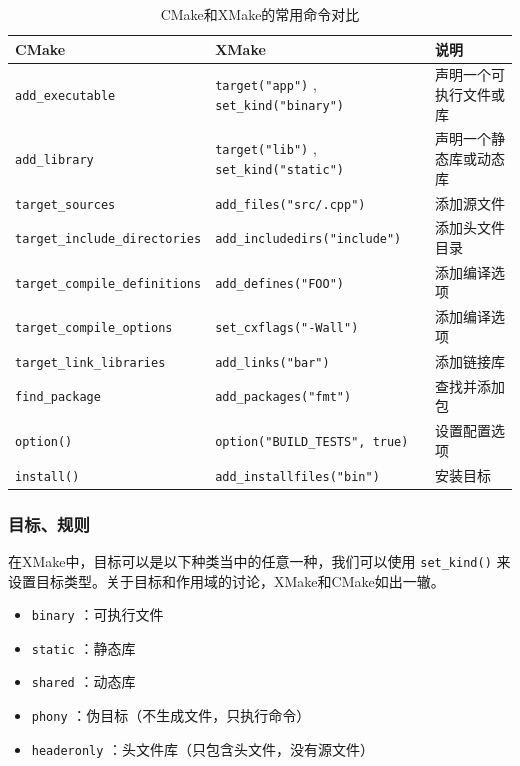 \begin{table}[ht]\small
    \centering
    \begin{tabular}{l|l|l}
        \hline
        CMake & XMake & 说明 \\
        \hline
        \texttt{add\_executable}  &  \texttt{target("app")} ,  \texttt{set\_kind("binary")}  & 声明一个可执行文件或库 \\
        \texttt{add\_library}  &  \texttt{target("lib")} ,  \texttt{set\_kind("static")}  & 声明一个静态库或动态库 \\
        \texttt{target\_sources}  &  \texttt{add\_files("src/\*.cpp")}  & 添加源文件 \\
        \texttt{target\_include\_directories}  &  \texttt{add\_includedirs("include")}  & 添加头文件目录 \\
        \texttt{target\_compile\_definitions}  &  \texttt{add\_defines("FOO")}  & 添加编译选项 \\
        \texttt{target\_compile\_options}  &  \texttt{set\_cxflags("-Wall")}  & 添加编译选项 \\
        \texttt{target\_link\_libraries}  &  \texttt{add\_links("bar")}  & 添加链接库 \\
        \texttt{find\_package}  &  \texttt{add\_packages("fmt")}  & 查找并添加包 \\
        \texttt{option()}  &  \texttt{option("BUILD\_TESTS", true)}  & 设置配置选项 \\
        \texttt{install()}  &  \texttt{add\_installfiles("bin")}  & 安装目标 \\
        \hline
    \end{tabular}
    \caption{CMake和XMake的常用命令对比}
\end{table}

\subsubsection{目标、规则}

在XMake中，目标可以是以下种类当中的任意一种，我们可以使用 \texttt{set\_kind()} 来设置目标类型。关于目标和作用域的讨论，XMake和CMake如出一辙。
\begin{itemize}
    \item  \texttt{binary} ：可执行文件
    \item  \texttt{static} ：静态库
    \item  \texttt{shared} ：动态库
    \item  \texttt{phony} ：伪目标（不生成文件，只执行命令）
    \item  \texttt{headeronly} ：头文件库（只包含头文件，没有源文件）
\end{itemize}

